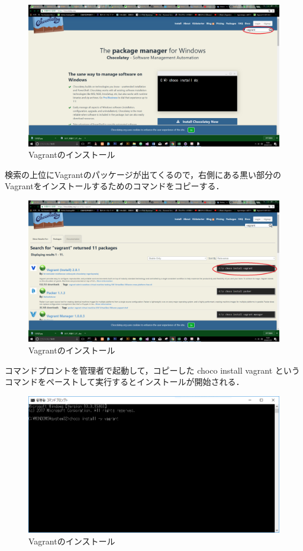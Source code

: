 \begin{figure}[h]
\centering
\includegraphics[width=12cm]{vagrantsearch.PNG}
\caption{Vagrantのインストール}\label{サンプル図}
\end{figure}


\newpage

検索の上位にVagrantのパッケージが出てくるので，右側にある黒い部分のVagrantをインストールするためのコマンドをコピーする．
\begin{figure}[h]
\centering
\includegraphics[width=12cm]{vagrantkopi.PNG}
\caption{Vagrantのインストール}\label{サンプル図}
\end{figure}


\newpage

コマンドプロントを管理者で起動して，コピーした choco install vagrant というコマンドをペーストして実行するとインストールが開始される．

\begin{figure}[h]
\centering
\includegraphics[width=12cm]{vagrant.PNG}
\caption{Vagrantのインストール}\label{サンプル図}
\end{figure}


